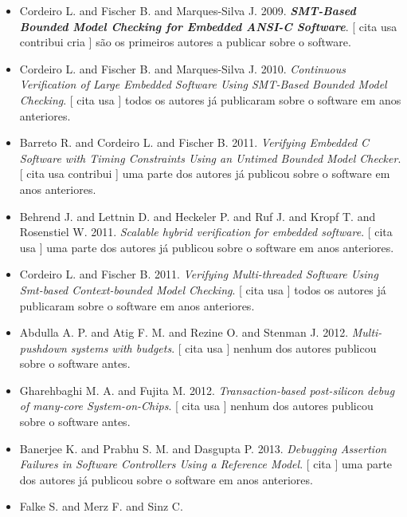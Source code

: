 \begin{itemize}
\item Cordeiro L. and Fischer B. and Marques-Silva J.
      2009.
        \textbf{\textit{ SMT-Based Bounded Model Checking for Embedded ANSI-C Software}}.
      [
          cita
          usa
          contribui
          cria
      ]
são os primeiros autores a publicar sobre o software.
\item Cordeiro L. and Fischer B. and Marques-Silva J.
      2010.
        \textit{ Continuous Verification of Large Embedded Software Using SMT-Based Bounded Model Checking}.
      [
          cita
          usa
      ]
todos os autores já publicaram sobre o software em anos anteriores.
\item Barreto R. and Cordeiro L. and Fischer B.
      2011.
        \textit{ Verifying Embedded C Software with Timing Constraints Using an Untimed Bounded Model Checker}.
      [
          cita
          usa
          contribui
      ]
uma parte dos autores já publicou sobre o software em anos anteriores.
\item Behrend J. and Lettnin D. and Heckeler P. and Ruf J. and Kropf T. and Rosenstiel W.
      2011.
        \textit{ Scalable hybrid verification for embedded software}.
      [
          cita
          usa
      ]
uma parte dos autores já publicou sobre o software em anos anteriores.
\item Cordeiro L. and Fischer B.
      2011.
        \textit{ Verifying Multi-threaded Software Using Smt-based Context-bounded Model Checking}.
      [
          cita
          usa
      ]
todos os autores já publicaram sobre o software em anos anteriores.
\item Abdulla A. P. and Atig F. M. and Rezine O. and Stenman J.
      2012.
        \textit{ Multi-pushdown systems with budgets}.
      [
          cita
          usa
      ]
nenhum dos autores publicou sobre o software antes.
\item Gharehbaghi M. A. and Fujita M.
      2012.
        \textit{ Transaction-based post-silicon debug of many-core System-on-Chips}.
      [
          cita
          usa
      ]
nenhum dos autores publicou sobre o software antes.
\item Banerjee K. and Prabhu S. M. and Dasgupta P.
      2013.
        \textit{ Debugging Assertion Failures in Software Controllers Using a Reference Model}.
      [
          cita
      ]
uma parte dos autores já publicou sobre o software em anos anteriores.
\item Falke S. and Merz F. and Sinz C.

\end{itemize}

